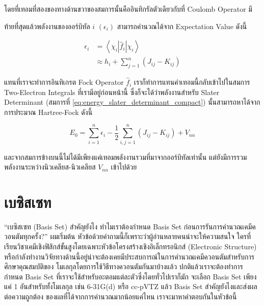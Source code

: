 \noindent โดยที่เทอมที่สองของทางด้านขวาของสมการนั้นคืออินทิกรัลตัวเดียวกับที่ Coulomb Operator มี

ท้ายที่สุดแล้วพลังงานของออร์บิทัล $i$ $(\epsilon_{i})$ สามารถคำนวณได้จาก Expectation Value ดังนี้

\begin{equation}
  \begin{aligned}
    \epsilon_i
     & = \left\langle\chi_i\left|\hat{f}_i\right| \chi_i\right\rangle \\
     & \approx h_i+\sum_{j=1}^n\left(J_{i j}-K_{i j}\right)
  \end{aligned}
\end{equation}

\noindent แทนที่เราจะทำการอินทิเกรต Fock Operator $\hat{f}_i$ เราก็ทำการแทนค่าเทอมนี้กลับเข้าไปในสมการ Two-Electron Integrals
ที่เรามีอยู่ก่อนหน้านี้ ซึ่งก็จะได้ว่าพลังงานสำหรับ Slater Determinant (สมการที่ \eqref{eq:energy_slater_determinant_compact})
นั้นสามารถหาได้จากการประมาณ Hartree-Fock ดังนี้

\begin{equation}
  E_0
  =
  \sum_{i=1}^n \epsilon_i
  -\frac{1}{2} \sum_{i, j=1}^n\left(J_{i j}-K_{i j}\right)
  + V_{n n}
\end{equation}

\noindent และจากสมการข้างบนนี้ไม่ได้มีเพียงแค่เทอมพลังงานรวมที่มาจากออร์บิทัลเท่านั้น แต่ยังมีการรวมพลังงานระหว่างนิวเคลียส-นิวเคลียส
$V_{n n}$ เข้าไปด้วย

\section{เบซิสเซท}

\enquote{เบซิสเซท (Basis Set) สำคัญยังไง ทำไมเราต้องกำหนด Basis Set ก่อนการรันการคำนวณเคมีควอนตัมทุกครั้ง?} ผมเริ่มต้น%
หัวข้อด้วยคำถามนี้ก็เพราะว่าผู้อ่านหลายคนน่าจะให้ความสนใจ ใครที่เรียนวิชาเคมีเชิงฟิสิกส์ขั้นสูงโดยเฉพาะหัวข้อโครงสร้างเชิงอิเล็กทรอนิกส์
(Electronic Structure) หรือกำลังทำงานวิจัยทางด้านนี้อยู่น่าจะต้องเคยมีประสบการณ์ในการคำนวณเคมีควอนตัมสำหรับการศึกษาคุณสมบัติของ%
โมเลกุลโดยการใช้วิธีทางควอนตัมกันมาบ้างแล้ว ปกติแล้วเราจะต้องทำการกำหนด Basis Set ที่เราจะใช้สำหรับอะตอมแต่ละตัวซึ่งโดยทั่วไปเราก็มัก%
จะเลือก Basis Set เพียงแค่ 1 อันสำหรับทั้งโมเลกุล เช่น 6-31G(d) หรือ cc-pVTZ แล้ว Basis Set สำคัญยังไงและส่งผลต่อความถูกต้อง%
ของผลที่ได้จากการคำนวณมากน้อยแค่ไหน เราจะมาหาคำตอบกันในหัวข้อนี้

